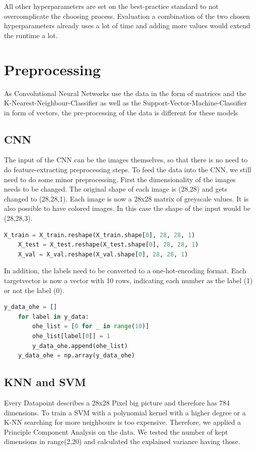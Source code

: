 \documentclass[12pt,a4paper]{scrartcl}		%
\begin{document}
            All other hyperparameters are set on the best-practice standard to not overcomplicate the choosing process. Evaluation a combination of the two 
            chosen hyperparameters already uses a lot of time and adding more values would extend the runtime a lot.

\section{Preprocessing}
    As Convolutional Neural Networks use the data in the form of matrices and the K-Nearest-Neighbour-Classifier as well as the 
    Support-Vector-Machine-Classifier in form of vectors, the pre-processing of the data is different for these models
    \subsection{CNN}
        The input of the CNN can be the images themselves, so that there is no need to do feature-extracting preprocessing steps.
        To feed the data into the CNN, we still need to do some minor preprocessing.
        First the dimensionality of the images needs to be changed. The original shape of each image is (28,28) and gets changed to (28,28,1).
        Each image is now a 28x28 matrix of greyscale values. It is also possible to have colored images. In this case the shape of the input 
        would be (28,28,3).
\begin{lstlisting}[language=Python]
    X_train = X_train.reshape(X_train.shape[0], 28, 28, 1)
    X_test = X_test.reshape(X_test.shape[0], 28, 28, 1)
    X_val = X_val.reshape(X_val.shape[0], 28, 28, 1)
\end{lstlisting}
        In addition, the labels need to be converted to a one-hot-encoding format. Each targetvector is now a vector with 10 rows, indicating 
        each number as the label (1) or not the label (0).
\begin{lstlisting}[language=Python]
    y_data_ohe = []
    for label in y_data:
        ohe_list = [0 for _ in range(10)]
        ohe_list[label[0]] = 1
        y_data_ohe.append(ohe_list)
    y_data_ohe = np.array(y_data_ohe)
\end{lstlisting}

    \subsection{KNN and SVM}
        Every Datapoint describes a 28x28 Pixel big picture and therefore has 784 dimensions. To train a SVM with a polynomial kernel with a 
        higher degree or a K-NN searching for more neighbours is too expensive. Therefore, we applied a Principle Component Analysis on the data. 
        We tested the number of kept dimensions in range(2,20) and calculated the explained variance having those. 
\end{document}

